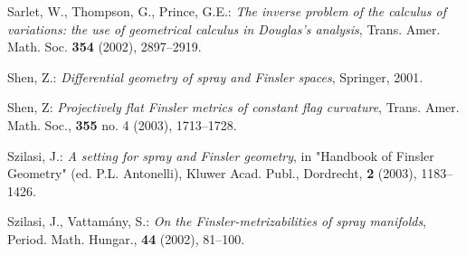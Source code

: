 \documentclass[oneside,english]{amsart}
\numberwithin{equation}{section}
\numberwithin{figure}{section}
\theoremstyle{plain}
\theoremstyle{plain}
\theoremstyle{definition}
\theoremstyle{plain}
\theoremstyle{plain}
\theoremstyle{plain}
\theoremstyle{remark}
\theoremstyle{remark}
\begin{document}
\begin{thebibliography}{99}
 Sarlet, W., Thompson, G.,  Prince, G.E.: \emph{The inverse
problem of the calculus of variations: the use of geometrical
calculus in Douglas's analysis}, Trans. Amer. Math. Soc.
\textbf{354} (2002), 2897--2919.

 Shen, Z.: \emph{Differential geometry of spray and Finsler
    spaces}, Springer, 2001.

 Shen, Z: \emph{Projectively flat Finsler metrics of constant flag curvature}, 
Trans. Amer. Math. Soc., \textbf{355} no. 4 (2003), 1713--1728.

 Szilasi, J.: \emph{A setting for spray and Finsler
    geometry}, in "Handbook of Finsler Geometry" (ed. P.L. Antonelli), Kluwer
  Acad. Publ., Dordrecht, \textbf{2} (2003), 1183--1426.

 Szilasi, J., Vattam\'any,  S.: \emph{On the
    Finsler-metrizabilities of spray manifolds}, Period. Math. Hungar.,
  \textbf{44} (2002), 81--100.


\end{thebibliography}
\end{document}
